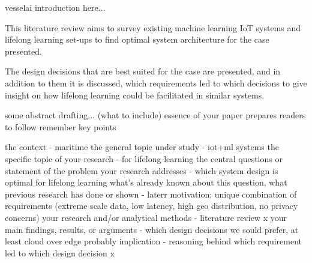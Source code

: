 vesselai introduction here...

This literature review aims to survey existing machine learning IoT systems and lifelong learning set-ups to find optimal system architecture for the case presented.

The design decisions that are best suited for the case are presented, and in addition to them it is discussed, which requirements led to which decisions to give insight on how lifelong learning could be facilitated in similar systems.

some abstract drafting... (what to include)
 essence of your paper
 prepares readers to follow
  remember key points
  
  the context - maritime
  the general topic under study - iot+ml systems
  the specific topic of your research - for lifelong learning
  the central questions or statement of the problem your research addresses - which system design is optimal for lifelong learning
  what’s already known about this question, what previous research has done or shown - laterr
  motivation: unique combination of requirements (extreme scale data, low latency, high geo distribution, no privacy concerns)
  your research and/or analytical methods - literature review x 
  your main findings, results, or arguments - which design decisions we sould prefer, at least cloud over edge probably
  implication - reasoning behind which requirement led to which design decision x


